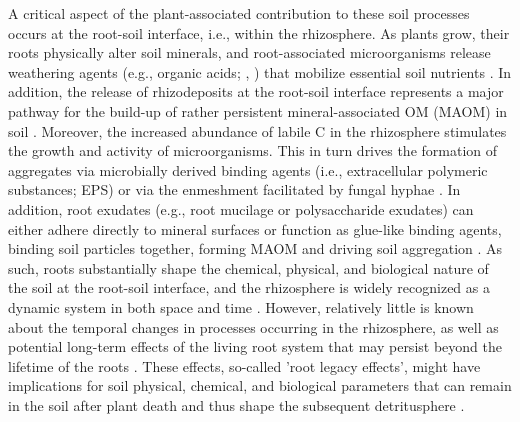 A critical aspect of the plant-associated contribution to these soil processes occurs at the root-soil interface, i.e., within the rhizosphere. As plants grow, their roots physically alter soil minerals, and root-associated microorganisms release weathering agents (e.g., organic acids; \citeauthor{Uroz2009}, \citeyear{Uroz2009}) that mobilize essential soil nutrients \citep{Gregory2022}. 
In addition, the release of rhizodeposits at the root-soil interface represents a major pathway for the build-up of rather persistent mineral-associated OM (MAOM) in soil \citep{Sokol2019, Villarino2021}. Moreover, the increased abundance of labile C in the rhizosphere stimulates the growth and activity of microorganisms. This in turn drives the formation of aggregates via microbially derived binding agents (i.e., extracellular polymeric substances; EPS) or via the enmeshment facilitated by fungal hyphae \citep{Chenu2011, Costa2018}. In addition, root exudates (e.g., root mucilage or polysaccharide exudates) can either adhere directly to mineral surfaces or function as glue-like binding agents, binding soil particles together, forming MAOM \citep{Roetzer2023} and driving soil aggregation \citep{Baumert2018}. As such, roots substantially shape the chemical, physical, and biological nature of the soil at the root-soil interface, and the rhizosphere is widely recognized as a dynamic system in both space and time \citep{Jones2009, Hinsinger2009, Kuzyakov2019}. However, relatively little is known about the temporal changes in processes occurring in the rhizosphere, as well as potential long-term effects of the living root system that may persist beyond the lifetime of the roots \citep{Oliver2021}. These effects, so-called 'root legacy effects', might have implications for soil physical, chemical, and biological parameters that can remain in the soil after plant death and thus shape the subsequent detritusphere \citep{Wurst2015}.

